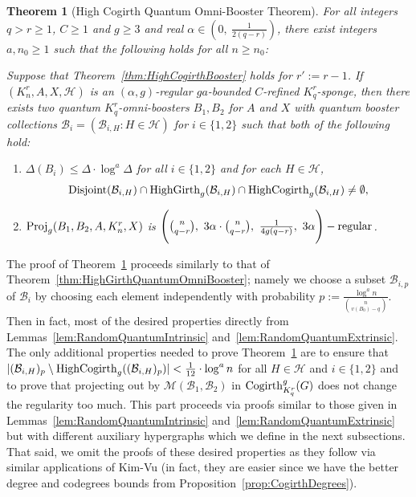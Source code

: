 \documentclass[11pt]{article}
\newcommand{\mc}[1]{\mathcal{#1}}
\newcounter{i}
\theoremstyle{plain}
\newtheorem{thm}{Theorem}[section]
\theoremstyle{plain} %
\theoremstyle{definition}
\begin{document}
\begin{thm}[High Cogirth Quantum Omni-Booster Theorem]\label{thm:HighCogirthQuantumOmniBooster}
For all integers $q>r\ge 1$, $C\ge 1$ and $g\ge 3$ and real $\alpha \in \left(0,~\frac{1}{2(q-r)}\right)$, there exist integers $a, n_0\ge 1$ such that the following holds for all $n\ge n_0$: 

Suppose that Theorem~\ref{thm:HighCogirthBooster} holds for $r':=r-1$. If $(K_n^r, A, X,\mc{H})$ is an $(\alpha,g)$-regular $ga$-bounded $C$-refined $K_q^r$-sponge, then there exists two quantum $K_q^r$-omni-boosters $B_1,B_2$ for $A$ and $X$ with quantum booster collections $\mc{B}_i=(\mathcal{B}_{i,H}: H\in \mathcal{H})$ for $i\in \{1,2\}$ such that both of the following hold:
\begin{enumerate}
    \item[(1)] $\Delta(B_i)\le \Delta\cdot \log^{a} \Delta$ for all $i\in\{1,2\}$ and for each $H\in \mathcal{H}$, 
    $${\rm Disjoint}(\mc{B}_{i,H}) \cap {\rm HighGirth}_g(\mc{B}_{i,H}) \cap {\rm HighCogirth}_g(\mc{B}_{i,H}) \ne \emptyset,$$
    \item[(2)] ${\rm Proj}_g(B_1,B_2,A,K_n^r,X)$ is $\Bigg(\binom{n}{q-r},~3\alpha \cdot \binom{n}{q-r},~\frac{1}{4g(q-r)},~3\alpha\Bigg)-{\rm regular}$.
\end{enumerate} 
\end{thm}

The proof of Theorem~\ref{thm:HighCogirthQuantumOmniBooster} proceeds similarly to that of Theorem~\ref{thm:HighGirthQuantumOmniBooster}; namely we choose a subset $\mc{B}_{i,p}$ of $\mc{B}_i$ by choosing each element independently with probability $p := \frac{\log^a n}{\binom{n}{v(B_0)-q}}$. Then in fact, most of the desired properties directly from Lemmas~\ref{lem:RandomQuantumIntrinsic} and~\ref{lem:RandomQuantumExtrinsic}. The only additional properties needed to prove Theorem~\ref{thm:HighCogirthQuantumOmniBooster} are to ensure that $|(\mc{B}_{i,H})_p \setminus {\rm HighCogirth}_g((\mc{B}_{i,H})_p)| < \frac{1}{12}\cdot \log^a n$ for all $H\in \mc{H}$ and $i\in \{1,2\}$ and to prove that projecting out by $\mc{M}(\mc{B}_1,\mc{B}_2)$ in ${\rm Cogirth}_{K_q^r}^g(G)$ does not change the regularity too much. This part proceeds via proofs similar to those given in Lemmas~\ref{lem:RandomQuantumIntrinsic} and~\ref{lem:RandomQuantumExtrinsic} but with different auxiliary hypergraphs which we define in the next subsections. That said, we omit the proofs of these desired properties as they follow via similar applications of Kim-Vu (in fact, they are easier since we have the better degree and codegrees bounds from Proposition~\ref{prop:CogirthDegrees}).
\end{document}
